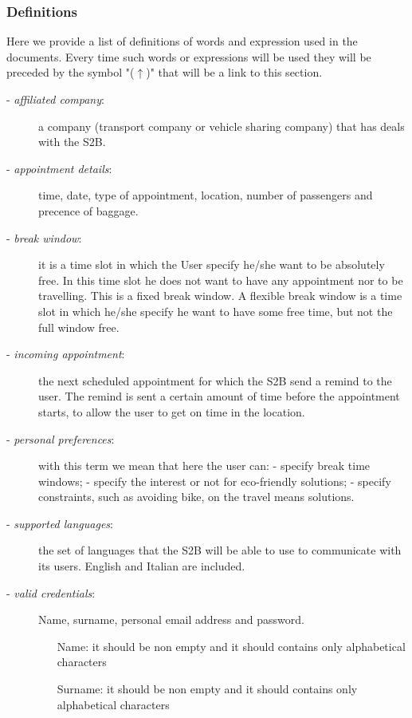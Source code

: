	\subsubsection{Definitions}
		\label{definitions}
		Here we provide a list of definitions of words and expression used in the documents. Every time such words or expressions will be used they will be preceded by the symbol "($\uparrow$)" that will be a link to this section.
		\begin{description}
			\item[- \textit{affiliated company}:] a company (transport company or vehicle sharing company) that has deals with the S2B.
			\item[- \textit{appointment details}:] time, date, type of appointment, location, number of passengers and precence of baggage.
			\item[- \textit{break window}:] it is a time slot in which the User specify he/she want to be absolutely free. In this time slot he does not want to have any appointment nor to be travelling. This is a fixed break window. A flexible break window is a time slot in which he/she specify he want to have some free time, but not the full window free.
			\item[- \textit{incoming appointment}:] the next scheduled appointment for which the S2B send a remind to the user. The remind is sent  a certain amount of time before the appointment starts, to allow the user to get on time in the location.
			\item[- \textit{personal preferences}:] with this term we mean that here the user can:\newline
			- specify break time windows; \newline
			- specify the interest or not for eco-friendly solutions;\newline
			- specify constraints, such as avoiding  bike, on the travel means solutions.
			\item[- \textit{supported languages}:] the set of languages that the S2B will be able to use to communicate with its users. English and Italian are included.
			\item[- \textit{valid credentials}:] Name, surname, personal email address and password.
			\begin{itemize}
				\item[Name:] it should be non empty and it should contains only alphabetical characters
				\item[Surname:] it should be non empty and it should contains only alphabetical characters

\end{itemize}
\end{description}
